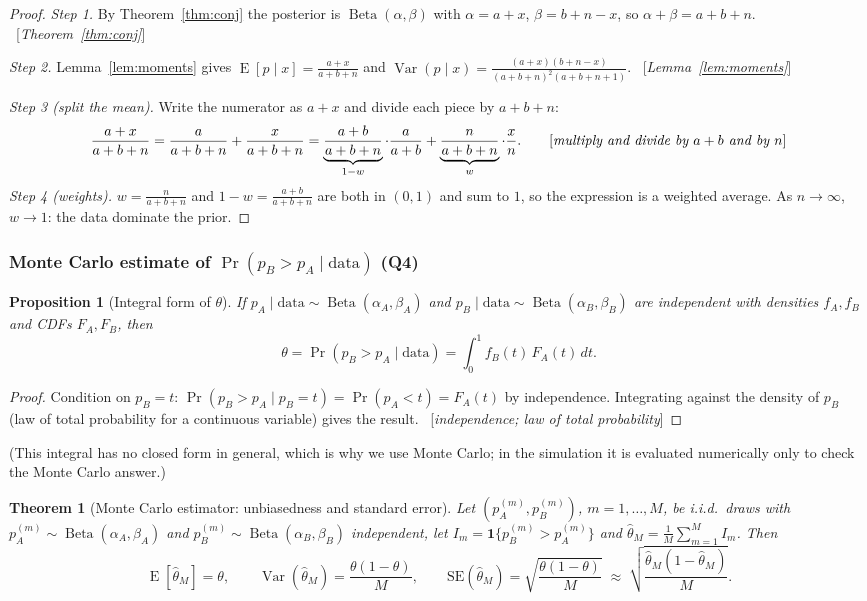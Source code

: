 \documentclass[11pt]{article}
\newtheorem{theorem}{Theorem}
\newtheorem{proposition}{Proposition}
\theoremstyle{definition}
\theoremstyle{remark}
\renewcommand{\Pr}{\operatorname{Pr}}
\newcommand{\E}{\operatorname{E}}
\newcommand{\Var}{\operatorname{Var}}
\newcommand{\Betad}{\operatorname{Beta}}
\newcommand{\ind}[1]{\mathbf{1}\{#1\}}
\newcommand{\data}{\text{data}}
\newcommand{\rulename}[1]{\ {[\emph{#1}]}}
\begin{document}
\begin{proof}
\emph{Step 1.} By Theorem~\ref{thm:conj} the posterior is $\Betad(\alpha,\beta)$ with $\alpha=a+x$, $\beta=b+n-x$,
so $\alpha+\beta=a+b+n$. \rulename{Theorem~\ref{thm:conj}}

\emph{Step 2.} Lemma~\ref{lem:moments} gives $\E[p\mid x]=\frac{a+x}{a+b+n}$ and
$\Var(p\mid x)=\frac{(a+x)(b+n-x)}{(a+b+n)^2(a+b+n+1)}$. \rulename{Lemma~\ref{lem:moments}}

\emph{Step 3 (split the mean).} Write the numerator as $a+x$ and divide each piece by $a+b+n$:
\[
\frac{a+x}{a+b+n}=\frac{a}{a+b+n}+\frac{x}{a+b+n}
=\underbrace{\frac{a+b}{a+b+n}}_{1-w}\cdot\frac{a}{a+b}
+\underbrace{\frac{n}{a+b+n}}_{w}\cdot\frac{x}{n}.
\tag*{[\emph{multiply and divide by $a+b$ and by $n$}]}
\]
\emph{Step 4 (weights).} $w=\frac{n}{a+b+n}$ and $1-w=\frac{a+b}{a+b+n}$ are both in $(0,1)$ and sum to $1$,
so the expression is a weighted average. As $n\to\infty$, $w\to1$: the data dominate the prior.
\end{proof}

\subsubsection[Monte Carlo estimate of \texorpdfstring{$\Pr(p_B>p_A\mid\data)$}{Pr(pB > pA | data)} (Q4)]{Monte Carlo estimate of $\Pr(p_B>p_A\mid\data)$ (Q4)}

\begin{proposition}[Integral form of $\theta$]\label{prop:theta}
If $p_A\mid\data\sim\Betad(\alpha_A,\beta_A)$ and $p_B\mid\data\sim\Betad(\alpha_B,\beta_B)$ are independent with
densities $f_A,f_B$ and CDFs $F_A,F_B$, then
\[
\theta=\Pr(p_B>p_A\mid\data)=\int_0^1 f_B(t)\,F_A(t)\,dt .
\]
\end{proposition}
\begin{proof}
Condition on $p_B=t$: $\Pr(p_B>p_A\mid p_B=t)=\Pr(p_A<t)=F_A(t)$ by independence.
Integrating against the density of $p_B$ (law of total probability for a continuous variable) gives the result.
\rulename{independence; law of total probability}
\end{proof}
(This integral has no closed form in general, which is why we use Monte Carlo; in the simulation it is
evaluated numerically only to check the Monte Carlo answer.)

\begin{theorem}[Monte Carlo estimator: unbiasedness and standard error]\label{thm:mc}
Let $(p_A^{(m)},p_B^{(m)})$, $m=1,\dots,M$, be i.i.d.\ draws with $p_A^{(m)}\sim\Betad(\alpha_A,\beta_A)$ and
$p_B^{(m)}\sim\Betad(\alpha_B,\beta_B)$ independent, let $I_m=\ind{p_B^{(m)}>p_A^{(m)}}$ and
$\hat\theta_M=\frac1M\sum_{m=1}^M I_m$. Then
\[
\E[\hat\theta_M]=\theta,\qquad
\Var(\hat\theta_M)=\frac{\theta(1-\theta)}{M},\qquad
\mathrm{SE}(\hat\theta_M)=\sqrt{\frac{\theta(1-\theta)}{M}}
\;\approx\;\sqrt{\frac{\hat\theta_M(1-\hat\theta_M)}{M}} .
\]
\end{theorem}
\end{document}
